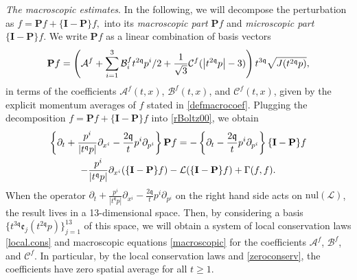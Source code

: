 \documentclass[reqno]{amsart}
\newcommand{\pv}{p}
\newcommand{\vnrm}[1]{\left\vert#1\right\vert}
\newcommand{\qq}{\mathfrak{q}}
\newcommand{\tq}{t^{\qq}}
\newcommand{\tqq}{t^{2\qq}}
\newcommand{\tTq}{t^{3\qq}}
\newcommand{\linL}{\mathcal{L}}
\newcommand{\macro}{{\bf P}}
\newcommand{\micro}{{\bf \{I- P\}}}
\newcommand{\CN}{\mathrm{nul}}
\theoremstyle{definition}
\numberwithin{equation}{section}
\numberwithin{theorem}{section}
\begin{document}
\textit{The macroscopic estimates}. In the following, we will decompose the perturbation as \(f=\mathbf{P}f+\{\mathbf{I}-\mathbf{P}\}f,\) into its \emph{macroscopic part} \(\mathbf{P}f\) and \emph{microscopic part} \(\{\mathbf{I}-\mathbf{P}\}f\). We write \(\mathbf{P}f\) as a linear combination of basis vectors
\begin{equation}\notag 
{\bf P}f=\left(  \mathcal{A}^f+\sum_{i=1}^{3} \mathcal{B}^f_i\tqq p^i/2+\frac{1}{\sqrt{3}}\mathcal{C}^f(\vnrm{\tqq\pv}-3)\right) \tTq\sqrt{J(\tqq p)},
\end{equation}
in terms of the coefficients \(\mathcal{A}^f(t,x)\), \(\mathcal{B}^f(t,x)\), and \(\mathcal{C}^f(t,x)\), given by the explicit momentum averages of \(f\) stated in \eqref{defmacrocoef}. Plugging the decomposition \(f=\mathbf{P}f+\{\mathbf{I}-\mathbf{P}\}f\) into \eqref{rBoltz00}, we obtain 
\begin{multline}\notag 
\left\{\partial_t+\frac{\pv^i}{|\tq \pv|} \partial_{x^i} -\frac{2\qq }{t} p^i \partial_{p^i} \right\}\macro f
= -\left\{\partial_t -\frac{2\qq }{t} p^i \partial_{p^i} \right\}\micro f
\\ 
-\frac{\pv^i}{|\tq \pv|} \partial_{x^i} (\micro f)  -\linL(\micro f)
+ \Gamma(f,f).
\end{multline}
When the operator \(\partial_t + \frac{\pv^i}{|\tq \pv|} \partial_{x^i} 
    -\frac{2\qq }{t} p^i \partial_{p^i} \) on the right hand side acts on ${\CN}(\linL)$, the result lives in a 13-dimensional space. Then, by considering a basis \(\{t^{3\mathfrak{q}}\mathfrak{e}_{j}(t^{2\mathfrak{q}}p)\}_{j=1}^{13}\) of this space, we will obtain a system of local conservation laws \eqref{local.cons} and macroscopic equations \eqref{macroscopic} for the coefficients \(\mathcal{A}^f\), \(\mathcal{B}^f\), and \(\mathcal{C}^f\). In particular, by the local conservation laws and \eqref{zeroconserv}, the coefficients have zero spatial average for all \(t\geq 1\). 
    
\end{document}
